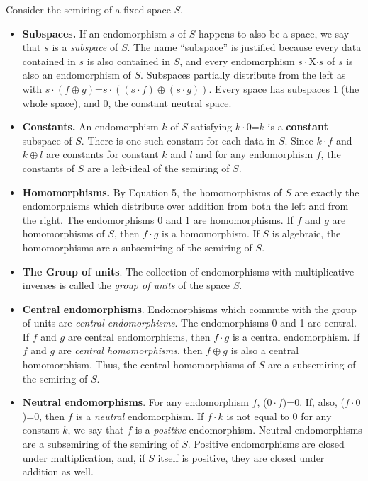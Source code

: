 \documentclass[11pt]{article}
\begin{document}
Consider the semiring of a fixed space $S$.  
\begin{itemize}

\item{{\bf Subspaces.} If an endomorphism $s$ of $S$ happens to also be a space, we say that $s$ is a {\it subspace} of $S$.  The name ``subspace'' is justified because every data contained in $s$ is also contained in $S$, and every endomorphism $s\cdot$X$\cdot s$ of $s$ is also an endomorphism of $S$.  
Subspaces partially distribute from the left as with $s\cdot(f\oplus g)$=$s\cdot((s\cdot f)\oplus(s\cdot g))$.
Every space has subspaces $1$ (the whole space), and $0$, the constant neutral space.} 

\item{{\bf Constants.} An endomorphism $k$ of $S$ satisfying $k\cdot 0$=$k$ is a {\bf constant} subspace of $S$.  There is one such constant for each 
data in $S$.  Since $k\cdot f$ and $k\oplus l$ are constants for 
constant $k$ and $l$ and for any endomorphism $f$, the constants of $S$ are a left-ideal of the semiring of $S$.} 

\item{{\bf Homomorphisms.}  By Equation 5, the homomorphisms of $S$ are exactly the endomorphisms which distribute over addition from
both the left and from the right.  The endomorphisms 0 and 1 are homomorphisms.  If $f$ and $g$ are homomorphisms of $S$, then 
$f\cdot g$ is a homomorphism.  If $S$ is algebraic, the homomorphisms are a subsemiring of the semiring of $S$.} 

\item {{\bf The Group of units}. The collection of endomorphisms with multiplicative inverses is called the {\it group of units} of the space $S$.} 

\item{{\bf Central endomorphisms}.  Endomorphisms which commute with the group of units are {\it central endomorphisms}.  The endomorphisms 0 and 1 
are central.  If $f$ and $g$ are central endomorphisms, then $f\cdot g$ is a central endomorphism.  If $f$ and $g$ are {\it central homomorphisms}, then 
$f\oplus g$ is also a central homomorphism.  Thus, the central homomorphisms of $S$ are a subsemiring of the semiring of $S$.}

\item{{\bf Neutral endomorphisms}.  For any endomorphism $f$, ($0\cdot f$)=$0$.  If, also, ($f\cdot 0$)=$0$, then $f$ is a {\it neutral} endomorphism. 
If $f\cdot k$ is not equal to $0$ for any constant $k$, we say that $f$ is a {\it positive} endomorphism. Neutral endomorphisms are a subsemiring of
the semiring of $S$.  Positive endomorphisms are closed under multiplication, and, if $S$ itself is positive, they are closed under addition as well.} 
\end{itemize} 
\end{document}
